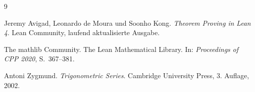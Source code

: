 \begin{thebibliography}{9}

Jeremy Avigad, Leonardo de Moura und Soonho Kong.
\newblock \emph{Theorem Proving in Lean 4}.
\newblock Lean Community, laufend aktualisierte Ausgabe.

The mathlib Community.
\newblock The Lean Mathematical Library.
\newblock In: \emph{Proceedings of CPP 2020}, S.~367--381.

Antoni Zygmund.
\newblock \emph{Trigonometric Series}.
\newblock Cambridge University Press, 3. Auflage, 2002.

\end{thebibliography}
